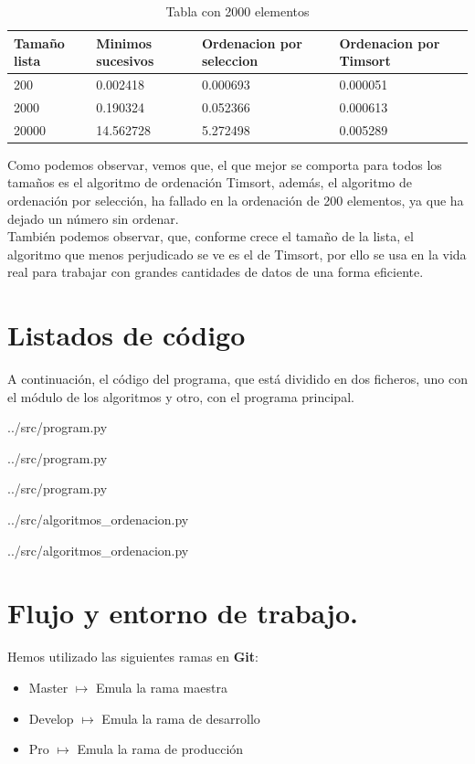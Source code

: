 \documentclass[a4,12pt]{article}
\newcommand{\gris}{\color[gray]{0.9}}
\newcommand{\grisos}{\color[gray]{0.5}}
\newcommand{\showprog}[3]
{
	
	\begin{minipage}{\textwidth}
		
		{../src/#1}
	\end{minipage} 
}
\begin{document}
	\begin{table}[h]
		\begin{center}
			
			\begin{tabular}{l|l|l|l|}
				Tamaño lista & Minimos sucesivos & Ordenacion por seleccion & Ordenacion por Timsort \\\hline
				200 & 0.002418 & 0.000693 & 0.000051 \\
				2000 & 0.190324 & 0.052366 & 0.000613 \\
				20000 & 14.562728 & 5.272498 & 0.005289
			\end{tabular}
			
		\end{center}
		
		\caption{Tabla con 2000 elementos}
		\label{tab:tab1}
	\end{table}
	Como podemos observar, vemos que, el que mejor se comporta para todos los tamaños es el algoritmo de ordenación Timsort, además, el algoritmo de ordenación por selección, ha fallado en la ordenación de 200 elementos, ya que ha dejado un número sin ordenar.\\
	
	También podemos observar, que, conforme crece el tamaño de la lista, el algoritmo que menos perjudicado se ve es el de Timsort, por ello se usa en la vida real para trabajar con grandes cantidades de datos de una forma eficiente.
	
	\section{Listados de código}
	A continuación, el código del programa, que está dividido en dos ficheros, uno con el módulo de los algoritmos y otro, con el programa principal.
	
	\showprog{program.py}{40}{0}
	\showprog{program.py}{75}{41}
	\showprog{program.py}{110}{76}
	
	\showprog{algoritmos\string_ordenacion.py}{35}{0}
	\showprog{algoritmos\string_ordenacion.py}{48}{36}
	
	\section{Flujo y entorno de trabajo.}
	Hemos utilizado las siguientes ramas en \textbf{Git}:
	
	\begin{itemize}
		\item Master $\mapsto$ Emula la rama maestra
		\item Develop $\mapsto$ Emula la rama de desarrollo
		\item Pro $\mapsto$ Emula la rama de producción
	\end{itemize}
	
\end{document}
